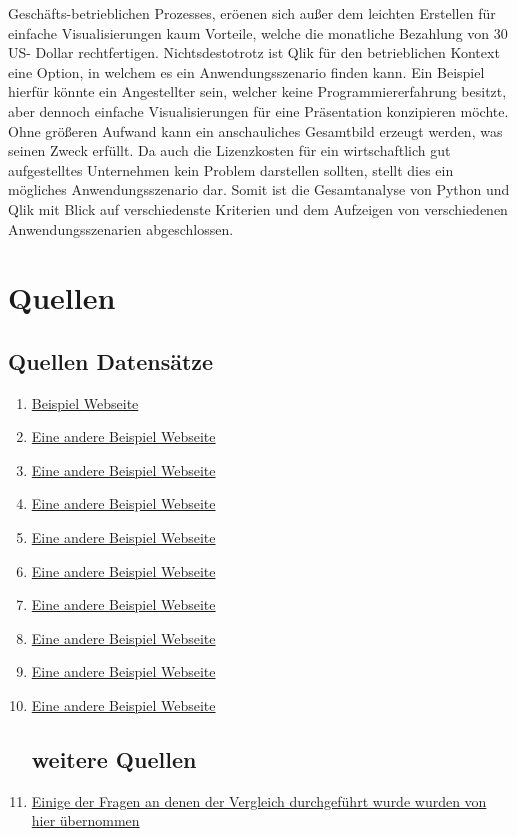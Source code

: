 \documentclass[12pt]{article}
\begin{document}
	Geschäfts-betrieblichen Prozesses, eröenen sich außer dem leichten Erstellen für
	einfache Visualisierungen kaum Vorteile, welche die monatliche Bezahlung von 30 US-
	Dollar rechtfertigen.
	Nichtsdestotrotz ist Qlik für den betrieblichen Kontext eine Option, in welchem es ein
	Anwendungsszenario finden kann.
	Ein Beispiel hierfür könnte ein Angestellter sein, welcher keine Programmiererfahrung
	besitzt, aber dennoch einfache Visualisierungen für eine Präsentation konzipieren
	möchte. Ohne größeren Aufwand kann ein anschauliches Gesamtbild erzeugt werden,
	was seinen Zweck erfüllt.
	Da auch die Lizenzkosten für ein wirtschaftlich gut aufgestelltes Unternehmen kein
	Problem darstellen sollten, stellt dies ein mögliches Anwendungsszenario dar.
	Somit ist die Gesamtanalyse von Python und Qlik mit Blick auf verschiedenste Kriterien
	und dem Aufzeigen von verschiedenen Anwendungsszenarien abgeschlossen.
	
	\section{Quellen}
	
	\subsection{Quellen Datensätze}
	
	\begin{enumerate}
		\item \href{https://example.com}{Beispiel Webseite}
		\item \href{https://example.org}{Eine andere Beispiel Webseite}
		\item \href{https://example.org}{Eine andere Beispiel Webseite}
		\item \href{https://example.org}{Eine andere Beispiel Webseite}
		\item \href{https://example.org}{Eine andere Beispiel Webseite}
		\item \href{https://example.org}{Eine andere Beispiel Webseite}
		\item \href{https://example.org}{Eine andere Beispiel Webseite}
		\item \href{https://example.org}{Eine andere Beispiel Webseite}
		\item \href{https://example.org}{Eine andere Beispiel Webseite}
		\item \href{https://example.org}{Eine andere Beispiel Webseite}
		
		\subsection{weitere Quellen}
		\item \href{https://www.gapminder.org/}{Einige der Fragen an denen der Vergleich durchgeführt wurde wurden von hier übernommen}
		
	\end{enumerate}
	
\end{document}
